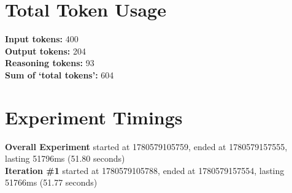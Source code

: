 \documentclass{article}
\begin{document}
\section*{Total Token Usage}
\textbf{Input tokens: }400
\\\textbf{Output tokens: }204
\\\textbf{Reasoning tokens: }93
\\\textbf{Sum of `total tokens': }604
\section*{Experiment Timings}
\textbf{Overall Experiment} started at 1780579105759, ended at 1780579157555, lasting 51796ms (51.80 seconds)
\\\textbf{Iteration \#1} started at 1780579105788, ended at 1780579157554, lasting 51766ms (51.77 seconds)
\end{document}
